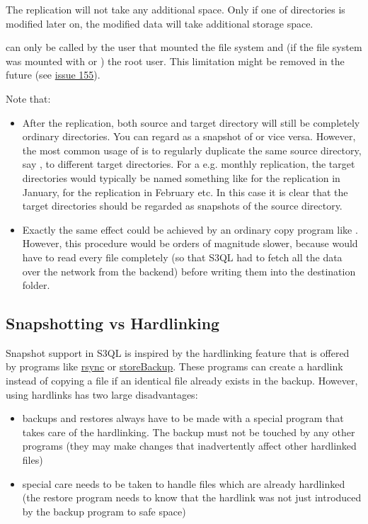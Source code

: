 \documentclass[letterpaper,10pt,english]{sphinxmanual}
\begin{document}
The replication will not take any additional space. Only if one of
directories is modified later on, the modified data will take
additional storage space.

 can only be called by the user that mounted the file system
and (if the file system was mounted with  or )
the root user. This limitation might be removed in the future (see \href{http://code.google.com/p/s3ql/issues/detail?id=155}{issue 155}).

Note that:
\begin{itemize}
\item {} 
After the replication, both source and target directory will still
be completely ordinary directories. You can regard  as a
snapshot of  or vice versa. However, the most common
usage of  is to regularly duplicate the same source
directory, say , to different target directories. For a
e.g. monthly replication, the target directories would typically be
named something like  for the replication in
January,  for the replication in February etc.
In this case it is clear that the target directories should be
regarded as snapshots of the source directory.

\item {} 
Exactly the same effect could be achieved by an ordinary copy
program like . However, this procedure would be orders of
magnitude slower, because  would have to read every file
completely (so that S3QL had to fetch all the data over the network
from the backend) before writing them into the destination folder.

\end{itemize}


\subsection{Snapshotting vs Hardlinking}
\label{special:snapshotting-vs-hardlinking}
Snapshot support in S3QL is inspired by the hardlinking feature that
is offered by programs like \href{http://www.samba.org/rsync}{rsync} or
\href{http://savannah.nongnu.org/projects/storebackup}{storeBackup}.
These programs can create a hardlink instead of copying a file if an
identical file already exists in the backup. However, using hardlinks
has two large disadvantages:
\begin{itemize}
\item {} 
backups and restores always have to be made with a special program
that takes care of the hardlinking. The backup must not be touched
by any other programs (they may make changes that inadvertently
affect other hardlinked files)

\item {} 
special care needs to be taken to handle files which are already
hardlinked (the restore program needs to know that the hardlink was
not just introduced by the backup program to safe space)

\end{itemize}
\end{document}
